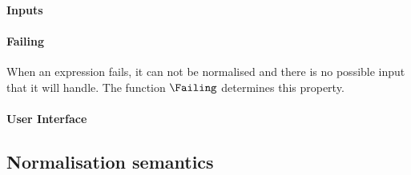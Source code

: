 \paragraph{Inputs}

\paragraph{Failing}

When an expression fails, it can not be normalised and there is no possible
input that it will handle. The function $\Failing$ determines this property.

\paragraph{User Interface }



\subsection{Normalisation semantics}

